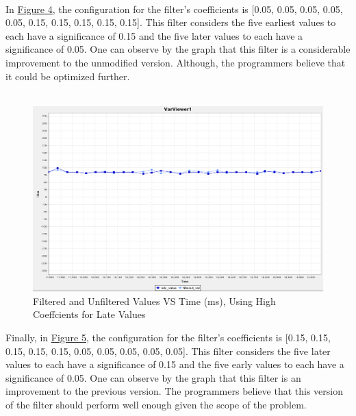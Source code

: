 \documentclass[12pt]{report}
\begin{document}
\\In \hyperref[fig4]{Figure 4}, the configuration for the filter's coefficients is [0.05, 0.05, 0.05, 0.05,
0.05, 0.15, 0.15, 0.15, 0.15, 0.15]. This filter considers the five earliest values to each have a
significance of 0.15 and the five later values to each have a significance of 0.05. One can observe
by the graph that this filter is a considerable improvement to the unmodified version. Although, the
programmers believe that it could be optimized further.\\\\
\begin{figure}[h]%
	\caption{Filtered and Unfiltered Values VS Time (ms), Using High Coeffcients for Late
	Values}\label{fig5}
	\begin{center}
		\includegraphics[scale=0.5]{./figures/adc_10coeffs_late_high_values.PNG}
	\end{center}
\end{figure}
Finally, in \hyperref[fig5]{Figure 5}, the configuration for the filter's coefficients is [0.15,
	0.15, 0.15, 0.15,
0.15, 0.05, 0.05, 0.05, 0.05, 0.05]. This filter considers the five later values to each have a
significance of 0.15 and the five early values to each have a significance of 0.05. One can observe
by the graph that this filter is an improvement to the previous version. The programmers believe
that this version of the filter should perform well enough given the scope of the problem.
\end{document}
